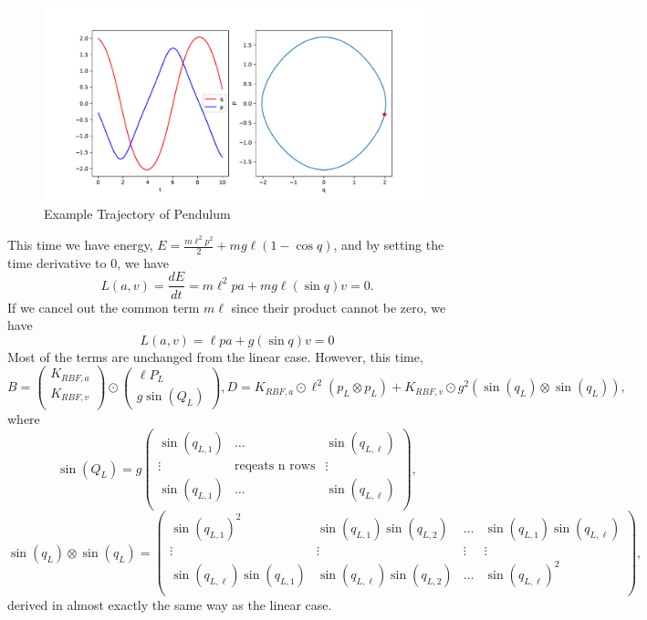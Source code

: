\documentclass{statsmsc}
\begin{document}
\begin{figure}[H] 
  \includegraphics[width=0.6\linewidth]{../codes/figures/pendulum_trajectory_1D.pdf}
  \centering
  \caption{Example Trajectory of Pendulum}
  \label{fig:pendulum_trajectory}
\end{figure}

This time we have energy, $E=\frac{m\ell^2p^2}{2}+mg\ell(1-\cos q)$, and by setting the time derivative to 0, we have 
$$L(a, v)=\frac{dE}{dt}=m\ell^2pa+mg\ell(\sin q)v=0.$$
If we cancel out the common term $m\ell$ since their product cannot be zero, we have $$L(a,v)=\ell pa+g(\sin q)v=0$$
Most of the terms are unchanged from the linear case. 
However, this time, 
$$
B=\begin{pmatrix}
    K_{RBF,a} \\ K_{RBF,v} \\
\end{pmatrix}\odot \begin{pmatrix}
    \ell P_L \\ g\sin(Q_L)
\end{pmatrix}, D=K_{RBF,a}\odot \ell^2(p_L\otimes p_L) + K_{RBF,v}\odot g^2(\sin(q_L)\otimes \sin(q_L)),
$$
where 
$$
\sin(Q_L) = g\begin{pmatrix}
  \sin(q_{L,1})  & \dots & \sin(q_{L,\ell})  \\
  \vdots & \text{reqeats n rows} &  \vdots\\
  \sin(q_{L,1})  & \dots & \sin(q_{L,\ell})  \\
\end{pmatrix},
$$
$$
\sin(q_L)\otimes \sin(q_L)=\begin{pmatrix}
  \sin(q_{L,1})^2 & \sin(q_{L,1})\sin(q_{L,2}) & \dots & \sin(q_{L,1})\sin(q_{L,\ell}) \\
  \vdots & \vdots & \vdots & \vdots \\
  \sin(q_{L,\ell})\sin(q_{L,1}) & \sin(q_{L,\ell})\sin(q_{L,2}) & \dots & \sin(q_{L,\ell})^2 \\
\end{pmatrix},
$$
derived in almost exactly the same way as the linear case. 
\end{document}
